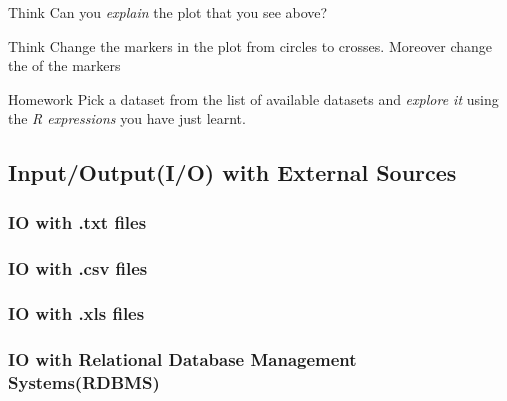 \begin{DIY}{Think}
Can you \emph{explain} the plot that you see above?
\end{DIY}

\begin{DIY}{Think}
Change the markers in the plot from circles to crosses. Moreover change the of the markers
\end{DIY}

\begin{DIY}{Homework}
Pick a dataset from the list of available datasets and \emph{explore it} using the \emph{R expressions} you have just learnt.
\end{DIY}

\subsection{Input/Output(I/O) with External Sources}
\subsubsection{IO with .txt files}
\subsubsection{IO with .csv files}
\subsubsection{IO with .xls files}
\subsubsection{IO with Relational Database Management Systems(RDBMS)}
